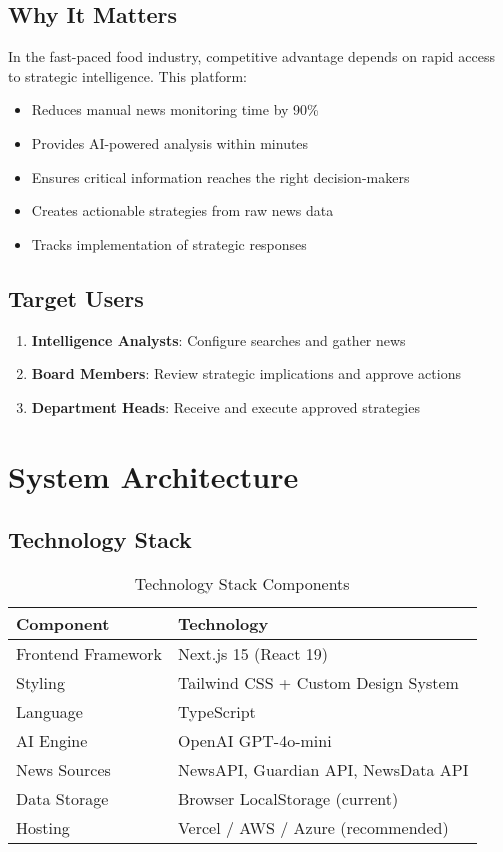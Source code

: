 \documentclass[11pt,a4paper]{article}
\begin{document}
\subsection{Why It Matters}
In the fast-paced food industry, competitive advantage depends on rapid access to strategic intelligence. This platform:
\begin{itemize}[leftmargin=*]
    \item Reduces manual news monitoring time by 90\%
    \item Provides AI-powered analysis within minutes
    \item Ensures critical information reaches the right decision-makers
    \item Creates actionable strategies from raw news data
    \item Tracks implementation of strategic responses
\end{itemize}

\subsection{Target Users}
\begin{enumerate}
    \item \textbf{Intelligence Analysts}: Configure searches and gather news
    \item \textbf{Board Members}: Review strategic implications and approve actions
    \item \textbf{Department Heads}: Receive and execute approved strategies
\end{enumerate}

\section{System Architecture}

\subsection{Technology Stack}

\begin{table}[h]
\centering
\begin{tabular}{@{}ll@{}}
\toprule
\textbf{Component} & \textbf{Technology} \\ \midrule
Frontend Framework & Next.js 15 (React 19) \\
Styling & Tailwind CSS + Custom Design System \\
Language & TypeScript \\
AI Engine & OpenAI GPT-4o-mini \\
News Sources & NewsAPI, Guardian API, NewsData API \\
Data Storage & Browser LocalStorage (current) \\
Hosting & Vercel / AWS / Azure (recommended) \\
\bottomrule
\end{tabular}
\caption{Technology Stack Components}
\end{table}
\end{document}
